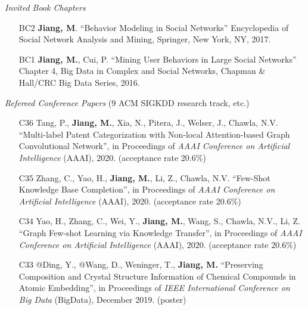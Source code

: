 \documentclass[10pt]{article}
\newenvironment{myindentpar}[1]%
{\begin{list}{}%
         {\setlength{\leftmargin}{#1}}%
         \item[]%
}
{\end{list}}
\newcounter{list}
\begin{document}
\begin{myindentpar}{0.00cm}

\hspace{-0.25cm}\emph{Invited Book Chapters}

\begin{enumerate}[leftmargin=.5cm]

\item[BC2] \textbf{Jiang, M}. ``Behavior Modeling in Social Networks'' Encyclopedia of Social Network Analysis and Mining, Springer, New York, NY, 2017.
		
\item[BC1] \textbf{Jiang, M.}, Cui, P. ``Mining User Behaviors in Large Social Networks'' Chapter 4, Big Data in Complex and Social Networks, Chapman \& Hall/CRC Big Data Series, 2016.

\end{enumerate}

\hspace{-0.25cm}\emph{Refereed Conference Papers} {\small (9 ACM SIGKDD research track, etc.)}

\begin{enumerate}[leftmargin=.5cm]

\item[C36] Tang, P., \textbf{Jiang, M.}, Xia, N., Pitera, J., Welser, J., Chawla, N.V. ``Multi-label Patent Categorization with Non-local Attention-based Graph Convolutional Network'', in Proceedings of \textit{AAAI Conference on Artificial Intelligence} (AAAI), 2020. (acceptance rate 20.6\%)
	
\item[C35] Zhang, C., Yao, H., \textbf{Jiang, M.}, Li, Z., Chawla, N.V. ``Few-Shot Knowledge Base Completion'', in Proceedings of \textit{AAAI Conference on Artificial Intelligence} (AAAI), 2020. (acceptance rate 20.6\%)

\item[C34] Yao, H., Zhang, C., Wei, Y., \textbf{Jiang, M.}, Wang, S., Chawla, N.V., Li, Z. ``Graph Few-shot Learning via Knowledge Transfer'', in Proceedings of \textit{AAAI Conference on Artificial Intelligence} (AAAI), 2020. (acceptance rate 20.6\%)

\item[C33] @Ding, Y., @Wang, D., Weninger, T., \textbf{Jiang, M.} ``Preserving Composition and Crystal Structure Information of Chemical Compounds in Atomic Embedding'', in Proceedings of \textit{IEEE International Conference on Big Data} (BigData), December 2019. (poster)


\end{enumerate}
\end{myindentpar}
\end{document}
